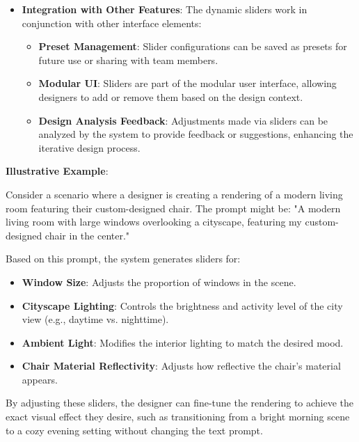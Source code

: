 \documentclass[12pt]{report}
\begin{document}
\begin{itemize}
    \item \textbf{Integration with Other Features}: The dynamic sliders work in conjunction with other interface elements:

    \begin{itemize}
        \item \textbf{Preset Management}: Slider configurations can be saved as presets for future use or sharing with team members.
        \item \textbf{Modular UI}: Sliders are part of the modular user interface, allowing designers to add or remove them based on the design context.
        \item \textbf{Design Analysis Feedback}: Adjustments made via sliders can be analyzed by the system to provide feedback or suggestions, enhancing the iterative design process.
    \end{itemize}
\end{itemize}

\textbf{Illustrative Example}:

Consider a scenario where a designer is creating a rendering of a modern living room featuring their custom-designed chair. The prompt might be: "A modern living room with large windows overlooking a cityscape, featuring my custom-designed chair in the center."

Based on this prompt, the system generates sliders for:

\begin{itemize}
    \item \textbf{Window Size}: Adjusts the proportion of windows in the scene.
    \item \textbf{Cityscape Lighting}: Controls the brightness and activity level of the city view (e.g., daytime vs. nighttime).
    \item \textbf{Ambient Light}: Modifies the interior lighting to match the desired mood.
    \item \textbf{Chair Material Reflectivity}: Adjusts how reflective the chair's material appears.
\end{itemize}

By adjusting these sliders, the designer can fine-tune the rendering to achieve the exact visual effect they desire, such as transitioning from a bright morning scene to a cozy evening setting without changing the text prompt.
\end{document}
